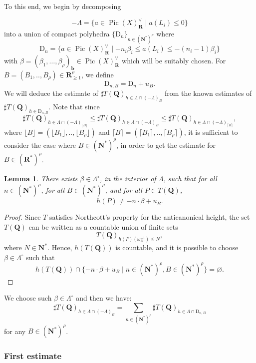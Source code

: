 \documentclass{proc-l}
\newcommand{\R}{\mathbf{R}}
\newcommand{\N}{\mathbf{N}}
\newcommand{\Q}{\mathbf{Q}}
\newcommand{\base}{\mathbf{b}}
\DeclareMathOperator{\Pic}{Pic}
\newcommand{\w}{\omega}
\newtheorem{lemma}[theorem]{Lemma}
\theoremstyle{definition}
\theoremstyle{remark}
\numberwithin{equation}{section}
\begin{document}
To this end, we begin by decomposing 

$$- \Lambda = \{ a \in \Pic(X)^{\vee}_{\R} \mid a(L_i) \leqslant 0 \}$$ 
into a union of compact polyhedra $\{ \mathrm{D}_n \}_{n \in (\N^*)^{\rho}}$ where 
$$\mathrm{D}_n = \{ a \in \Pic(X)^{\vee}_{\R} \mid - n_i  \beta_i \leqslant a(L_i) \leqslant - (n_i-1) \beta_i \}$$ 
with $\beta = (\beta_1, \dots, \beta_{\rho})_{\base} \in \Pic(X)^{\vee}_{\R}$ which will be suitably chosen. For $B = (B_1,..,B_{\rho}) \in \R_{\geqslant 1}^{\rho}$, we define 
$$\mathrm{D}_{n,B} = \mathrm{D}_n + u_B.$$We will deduce the estimate of $\sharp T(\Q)_{h \in \Lambda \cap (-\Lambda)_B}$ from the known estimates of $\sharp T(\Q)_{h \in \mathrm{D}_{n,B}}$. Note that since $$\sharp T(\Q)_{h \in \Lambda \cap (-\Lambda)_{\lfloor B \rfloor}} \leqslant \sharp T(\Q)_{h \in \Lambda \cap (-\Lambda)_B} \leqslant \sharp T(\Q)_{h \in \Lambda \cap (-\Lambda)_{\lceil B \rceil}},$$where $\lfloor B \rfloor = (\lfloor B_1 \rfloor,..,\lfloor B_{\rho} \rfloor ) $ and $\lceil B \rceil = (\lceil B_1 \rceil,..,\lceil B_{\rho} \rceil ) $, it is sufficient to consider the case where $B \in (\N^*)^{\rho}$, in order to get the estimate for $B \in (\R^*)^{\rho} $.

\begin{lemma}
There exists $\beta \in  \Lambda^{\circ}$, in the interior of $\Lambda$, such that for all $n \in (\N^*)^{\rho}$, for all $B \in (\N^*)^{\rho}$, and for all $P \in T(\Q)$, 
$$h(P) \neq - n \cdot \beta + u_B .$$ 
\end{lemma}

\begin{proof}
Since $T$ satisfies Northcott's property for the anticanonical height, the set $T(\Q)$ can be written as a countable union of finite sets 
$$T(\Q)_{h(P)(\w_{X}^{-1}) \leqslant N},$$ 
where $N \in \N^*$. Hence, $h(T(\Q))$ is countable, and it is possible to choose $\beta \in \Lambda^{\circ}$ such that 
$$h(T(\Q)) \cap \{  - n \cdot \beta + u_B \mid n \in (\N^*)^{\rho}, B \in (\N^*)^{\rho}\} = \varnothing.$$
\end{proof}

We choose such $\beta \in \Lambda^{\circ}$ and then we have:
$$\sharp T(\Q)_{h \in \Lambda \cap (-\Lambda)_B} = \sum\limits_{n \in (\N^*)^{\rho}} \sharp T(\Q)_{h \in \Lambda \cap \mathrm{D}_{n,B}} $$ for any $B \in (\N^*)^{\rho}$.


\subsubsection{First estimate}
\end{document}
